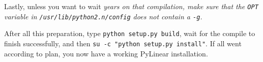 Lastly, unless you want to wait \em{years} on that compilation, make
sure that the \texttt{OPT} variable in
\texttt{/usr/lib/python2.n/config} does \em{not} contain a
\texttt{-g}.

After all this preparation, type \texttt{python setup.py build}, wait
for the compile to finish successfully, and then \texttt{su -c "python
setup.py install"}.  If all went according to plan, you now have a 
working PyLinear installation.
